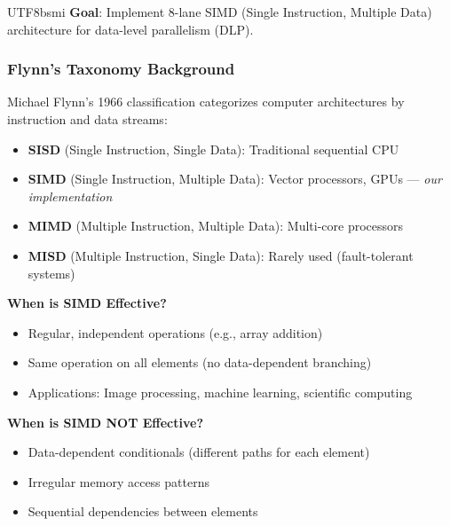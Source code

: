 \documentclass[journal,twoside]{IEEEtran}
\begin{document}
\begin{CJK}{UTF8}{bsmi}
\textbf{Goal}: Implement 8-lane SIMD (Single Instruction, Multiple Data) architecture for data-level parallelism (DLP).

\subsubsection{Flynn's Taxonomy Background}
Michael Flynn's 1966 classification categorizes computer architectures by instruction and data streams:
\begin{itemize}
    \item \textbf{SISD} (Single Instruction, Single Data): Traditional sequential CPU
    \item \textbf{SIMD} (Single Instruction, Multiple Data): Vector processors, GPUs --- \textit{our implementation}
    \item \textbf{MIMD} (Multiple Instruction, Multiple Data): Multi-core processors
    \item \textbf{MISD} (Multiple Instruction, Single Data): Rarely used (fault-tolerant systems)
\end{itemize}

\textbf{When is SIMD Effective?}
\begin{itemize}
    \item Regular, independent operations (e.g., array addition)
    \item Same operation on all elements (no data-dependent branching)
    \item Applications: Image processing, machine learning, scientific computing
\end{itemize}

\textbf{When is SIMD NOT Effective?}
\begin{itemize}
    \item Data-dependent conditionals (different paths for each element)
    \item Irregular memory access patterns
    \item Sequential dependencies between elements
\end{itemize}


\end{CJK}
\end{document}
